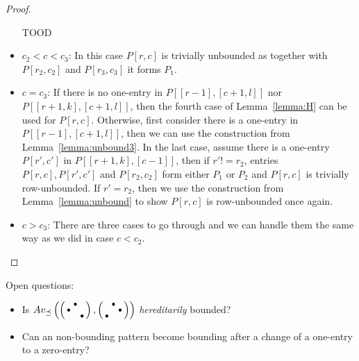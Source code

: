 \begin{proof}
\begin{itemize}
	TOOD
	\item $c_2<c<c_3$: In this case $P[r,c]$ is trivially unbounded as together with $P[r_2,c_2]$ and $P[r_3,c_3]$ it forms $P_1$.
	\item $c=c_3$: If there is no one-entry in $P[[r-1],[c+1,l]]$ nor $P[[r+1,k],[c+1,l]]$, then the fourth case of Lemma~\ref{lemma:H} can be used for $P[r,c]$. Otherwise, first consider there is a one-entry in $P[[r-1],[c+1,l]]$, then we can use the construction from Lemma~\ref{lemma:unbound3}. In the last case, assume there is a one-entry $P[r',c']$ in $P[[r+1,k],[c-1]]$, then if $r'!=r_2$, entries $P[r,c],P[r',c']$ and $P[r_2,c_2]$ form either $P_1$ or $P_2$ and $P[r,c]$ is trivially row-unbounded. If $r'=r_2$, then we use the construction from Lemma~\ref{lemma:unbound} to show $P[r,c]$ is row-unbounded once again.
	\item $c>c_3$: There are three cases to go through and we can handle them the same way as we did in case $c<c_2$.
\end{itemize}
\end{proof}

Open questions:
\begin{itemize}
	\item Is $Av_{\preceq}\left(\left(\begin{smallmatrix} &\bullet& \\\bullet& & \\ & &\bullet\end{smallmatrix}\right),\left(\begin{smallmatrix} &\bullet& \\ & &\bullet\\\bullet& & \end{smallmatrix}\right)\right)$ \emph{hereditarily} bounded?
	\item Can an non-bounding pattern become bounding after a change of a one-entry to a zero-entry?
\end{itemize}
